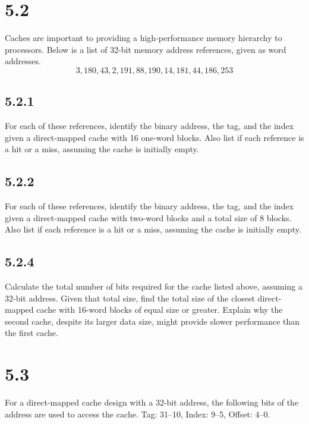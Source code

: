 \documentclass[paper=a4, fontsize=11pt]{scrartcl} %
\begin{document}
\section{5.2}
\begin{fancyquotes}
    Caches are important to providing a high-performance memory hierarchy to processors. Below is a list of 32-bit memory address references, given as word addresses.
    $$3, 180, 43, 2, 191, 88, 190, 14, 181, 44, 186, 253$$
\end{fancyquotes}

\subsection{5.2.1}
\begin{fancyquotes}
    For each of these references, identify the binary address, the tag, and the index given a direct-mapped cache with 16 one-word blocks. Also list if each reference is a hit or a miss, assuming the cache is initially empty.
\end{fancyquotes}


\subsection{5.2.2}
\begin{fancyquotes}
    For each of these references, identify the binary address, the tag, and the index given a direct-mapped cache with two-word blocks and a total size of 8 blocks. Also list if each reference is a hit or a miss, assuming the cache is initially empty.
\end{fancyquotes}

\subsection{5.2.4}
\begin{fancyquotes}
    Calculate the total number of bits required for the cache listed above, assuming a 32-bit address. Given that total size, find the total size of the closest direct-mapped cache with 16-word blocks of equal size or greater. Explain why the second cache, despite its larger data size, might provide slower performance than the first cache.
\end{fancyquotes}


\section{5.3}
\begin{fancyquotes}
    For a direct-mapped cache design with a 32-bit address, the following bits of the address are used to access the cache.
    Tag: 31--10, Index: 9--5, Offset: 4--0.
\end{fancyquotes}
\end{document}
